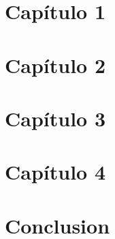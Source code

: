 \documentclass[11pt]{article}
\begin{document}
\renewcommand{\tablename}{Tabla}

\thispagestyle{empty}


\newpage
{}



\newpage


\tableofcontents
\newpage



\renewcommand{\listfigurename}{Lista de Figuras}
\listoffigures
\newpage


\renewcommand{\listtablename}{Lista de Tablas} 
\listoftables
\newpage



 \section{Capítulo 1}\label{sec:cap1}
   
   \newpage

 \section{Capítulo 2}\label{sec:cap2}
   
   \newpage

   \section{Capítulo 3}\label{sec:cap3}
   
   \newpage

   \section{Capítulo 4}\label{sec:cap4}
   
   \newpage

   \section{Conclusion}\label{sec:conclusion}
   
   \newpage


%
	
\end{document}
